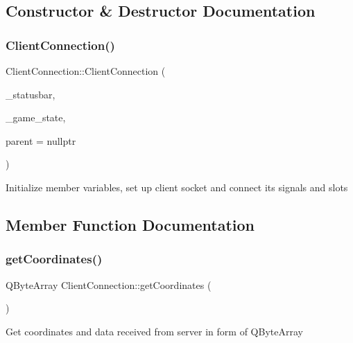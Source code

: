 \subsection{Constructor \& Destructor Documentation}
\mbox{\label{class_client_connection_af7853013395a43befeab1f44b0af863f}} 
\subsubsection{\texorpdfstring{Client\+Connection()}{ClientConnection()}}
{\footnotesize\ttfamily Client\+Connection\+::\+Client\+Connection (\begin{DoxyParamCaption}\item[{Q\+Status\+Bar $\ast$}]{\+\_\+statusbar,  }\item[{int $\ast$}]{\+\_\+game\+\_\+state,  }\item[{Q\+Object $\ast$}]{parent = {\ttfamily nullptr} }\end{DoxyParamCaption})\hspace{0.3cm}{\ttfamily [explicit]}}

Initialize member variables, set up client socket and connect its signals and slots 

\subsection{Member Function Documentation}
\mbox{\label{class_client_connection_a24fb529ef10c41be5239afe1928df87e}} 
\subsubsection{\texorpdfstring{get\+Coordinates()}{getCoordinates()}}
{\footnotesize\ttfamily Q\+Byte\+Array Client\+Connection\+::get\+Coordinates (\begin{DoxyParamCaption}{ }\end{DoxyParamCaption})\hspace{0.3cm}{\ttfamily [inline]}}

Get coordinates and data received from server in form of Q\+Byte\+Array \mbox{\label{class_client_connection_a12d5696ee4d4987e1926d1f8e6626af0}} 
